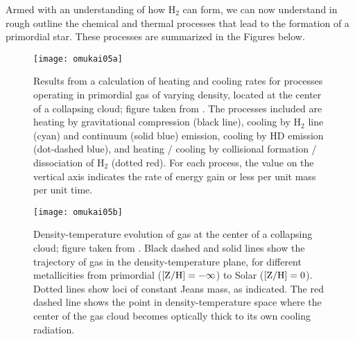 Armed with an understanding of how H$_2$ can form, we can now understand in rough outline the chemical and thermal processes that lead to the formation of a primordial star. These processes are summarized in the Figures below.

\begin{figure}
\texttt{[image: omukai05a]}
\caption[Heating and cooling processes in primordial gas]{
\label{fig:omukai05a}
Results from a calculation of heating and cooling rates for processes operating in primordial gas of varying density, located at the center of a collapsing cloud; figure taken from \citet{omukai05a}. The processes included are heating by gravitational compression (black line), cooling by H$_2$ line (cyan) and continuum (solid blue) emission, cooling by HD emission (dot-dashed blue), and heating / cooling by collisional formation / dissociation of H$_2$ (dotted red). For each process, the value on the vertical axis indicates the rate of energy gain or less per unit mass per unit time.
}
\end{figure}

\begin{figure}
\texttt{[image: omukai05b]}
\caption[Density-temperature evolution in primordial gas]{
\label{fig:omukai05b}
Density-temperature evolution of gas at the center of a collapsing cloud; figure taken from \citet{omukai05a}. Black dashed and solid lines show the trajectory of gas in the density-temperature plane, for different metallicities from primordial ($[{\rm Z}/{\rm H}] = -\infty$) to Solar ($[{\rm Z}/{\rm H}] = 0$). Dotted lines show loci of constant Jeans mass, as indicated. The red dashed line shows the point in density-temperature space where the center of the gas cloud becomes optically thick to its own cooling radiation.
}
\end{figure}

